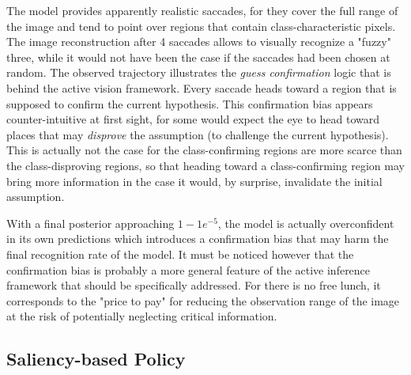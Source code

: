 \documentclass{article} %
\begin{document}
The model provides apparently realistic saccades, for they cover the full range of the image and tend to point over regions that contain class-characteristic pixels. The image reconstruction after 4 saccades allows to visually recognize a "fuzzy" three, while it would not have been the case if the saccades had been chosen at random.
The observed trajectory illustrates the \emph{guess confirmation} logic that is behind the active vision framework. Every saccade heads toward a region that is supposed to confirm the current hypothesis. This confirmation bias appears counter-intuitive at first sight, for some would expect the eye to head toward places that may \emph{disprove} the assumption (to challenge the current hypothesis). This is actually not the case for the class-confirming regions are more scarce than the class-disproving regions, so that heading toward a class-confirming region may bring more information in the case it would, by surprise, invalidate the initial assumption.

With a final posterior approaching $1 - 1e^{-5}$, the model is actually overconfident in its own predictions which introduces a confirmation bias that may harm the final recognition rate of the model. It must be noticed however that the confirmation bias is probably a more general feature of the active inference framework that should be specifically addressed. For there is no free lunch, it corresponds to the "price to pay" for reducing the observation range of the image at the risk of potentially neglecting critical information. 

\subsection{Saliency-based Policy}
\end{document}
